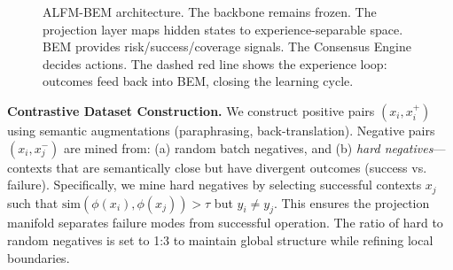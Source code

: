 \documentclass[twoside,11pt]{article}
\begin{document}
\begin{figure}[t]
    \centering
    \caption{ALFM-BEM architecture. The backbone remains frozen. The projection layer maps hidden states to experience-separable space. BEM provides risk/success/coverage signals. The Consensus Engine decides actions. The dashed red line shows the experience loop: outcomes feed back into BEM, closing the learning cycle.}
    \label{fig:arch}
\end{figure}

\textbf{Contrastive Dataset Construction.} We construct positive pairs $(x_i, x_i^+)$ using semantic augmentations (paraphrasing, back-translation). Negative pairs $(x_i, x_j^-)$ are mined from: (a) random batch negatives, and (b) \emph{hard negatives}---contexts that are semantically close but have divergent outcomes (success vs. failure). Specifically, we mine hard negatives by selecting successful contexts $x_j$ such that $\mathrm{sim}(\phi(x_i), \phi(x_j)) > \tau$ but $y_i \neq y_j$. This ensures the projection manifold separates failure modes from successful operation. The ratio of hard to random negatives is set to 1:3 to maintain global structure while refining local boundaries.
\end{document}
